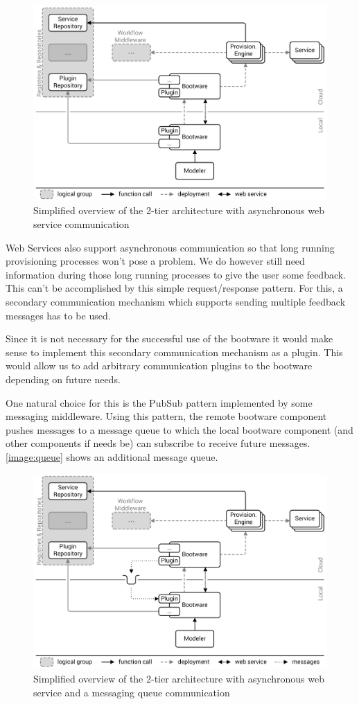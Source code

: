 \begin{figure}[!htbp]
	\centering
	\includegraphics[resolution=600]{design/assets/simple_webservice}
	\caption{Simplified overview of the 2-tier architecture with asynchronous web service communication}
	\label{image:webservice}
\end{figure}

Web Services also support asynchronous communication so that long running provisioning processes won't pose a problem.
We do however still need information during those long running processes to give the user some feedback.
This can't be accomplished by this simple request/response pattern.
For this, a secondary communication mechanism which supports sending multiple feedback messages has to be used.

Since it is not necessary for the successful use of the bootware it would make sense to implement this secondary communication mechanism as a plugin.
This would allow us to add arbitrary communication plugins to the bootware depending on future needs.

One natural choice for this is the PubSub pattern implemented by some messaging middleware.
Using this pattern, the remote bootware component pushes messages to a message queue to which the local bootware component (and other components if needs be) can subscribe to receive future messages.
\autoref{image:queue} shows an additional message queue.

\begin{figure}[!htbp]
	\centering
	\includegraphics[resolution=600]{design/assets/simple_queue}
	\caption{Simplified overview of the 2-tier architecture with asynchronous web service and a messaging queue communication}
	\label{image:queue}
\end{figure}

